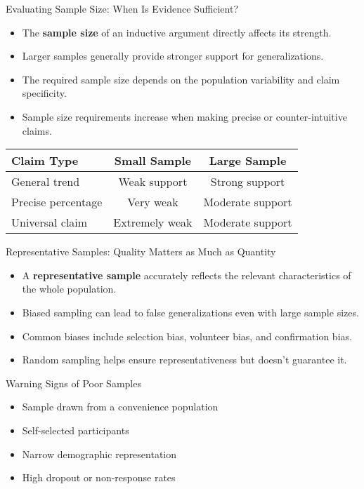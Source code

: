 \documentclass{beamer}
\begin{document}
\begin{frame}{Evaluating Sample Size: When Is Evidence Sufficient?}
    \begin{itemize}
        \item The \textbf{sample size} of an inductive argument directly affects its strength.
        \item Larger samples generally provide stronger support for generalizations.
        \item The required sample size depends on the population variability and claim specificity.
        \item Sample size requirements increase when making precise or counter-intuitive claims.
    \end{itemize}
    
    \begin{table}
        \centering
        \begin{tabular}{|l|c|c|}
            \hline
            \textbf{Claim Type} & \textbf{Small Sample} & \textbf{Large Sample} \\
            \hline
            General trend & Weak support & Strong support \\
            \hline
            Precise percentage & Very weak & Moderate support \\
            \hline
            Universal claim & Extremely weak & Moderate support \\
            \hline
        \end{tabular}
    \end{table}
\end{frame}

\begin{frame}{Representative Samples: Quality Matters as Much as Quantity}
    \begin{itemize}
        \item A \textbf{representative sample} accurately reflects the relevant characteristics of the whole population.
        \item Biased sampling can lead to false generalizations even with large sample sizes.
        \item Common biases include selection bias, volunteer bias, and confirmation bias.
        \item Random sampling helps ensure representativeness but doesn't guarantee it.
    \end{itemize}
    
    \begin{alertblock}{Warning Signs of Poor Samples}
        \begin{itemize}
            \item Sample drawn from a convenience population
            \item Self-selected participants
            \item Narrow demographic representation
            \item High dropout or non-response rates
        \end{itemize}
    \end{alertblock}
\end{frame}
\end{document}
